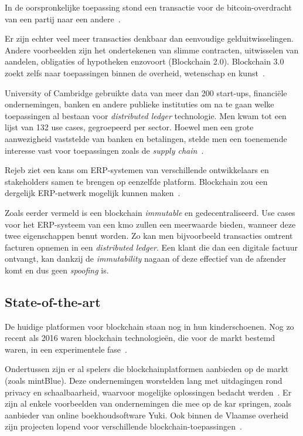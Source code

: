 In de oorspronkelijke toepassing stond een transactie voor de bitcoin-overdracht van een partij naar een andere~\autocite{Pierro2017}. 

Er zijn echter veel meer transacties denkbaar dan eenvoudige gelduitwisselingen. Andere voorbeelden zijn het ondertekenen van slimme contracten, uitwisselen van aandelen, obligaties of hypotheken enzovoort (Blockchain 2.0). Blockchain 3.0 zoekt zelfs naar toepassingen binnen de overheid, wetenschap en kunst~\autocite{Swan2015}.

University of Cambridge gebruikte data van meer dan 200 start-ups, financiële ondernemingen, banken en andere publieke instituties om na te gaan welke toepassingen al bestaan voor \textit{distributed ledger} technologie. Men kwam tot een lijst van 132 use cases, gegroepeerd per sector. Hoewel men een grote aanwezigheid vaststelde van banken en betalingen, stelde men een toenemende interesse vast voor toepassingen zoals de \textit{supply chain}~\autocite{Hileman2017}.

Rejeb ziet een kans om ERP-systemen van verschillende ontwikkelaars en stakeholders samen te brengen op eenzelfde platform. Blockchain zou een dergelijk ERP-netwerk mogelijk kunnen maken~\autocite{Rejeb2018}.

Zoals eerder vermeld is een blockchain \textit{immutable} en gedecentraliseerd. Use cases voor het ERP-systeem van een kmo zullen een meerwaarde bieden, wanneer deze twee eigenschappen benut worden. Zo kan men bijvoorbeeld transacties omtrent facturen opnemen in een \textit{distributed ledger}. Een klant die dan een digitale factuur ontvangt, kan dankzij de \textit{immutability} nagaan of deze effectief van de afzender komt en dus geen \textit{spoofing} is.


\subsection{State-of-the-art}
\label{sub:state-of-the-art}

De huidige platformen voor blockchain staan nog in hun kinderschoenen. Nog zo recent als 2016 waren blockchain technologieën, die voor de markt bestemd waren, in een experimentele fase~\autocite{Davidson2016}.

Ondertussen zijn er al spelers die blockchainplatformen aanbieden op de markt (zoals mintBlue). Deze ondernemingen worstelden lang met uitdagingen rond privacy en schaalbaarheid, waarvoor mogelijke oplossingen bedacht werden~\autocite{Kaptijn}. Er zijn al enkele voorbeelden van ondernemingen die mee op de kar springen, zoals aanbieder van online boekhoudsoftware Yuki. Ook binnen de Vlaamse overheid zijn projecten lopend voor verschillende blockchain-toepassingen~\autocite{Schiltz2018}.


